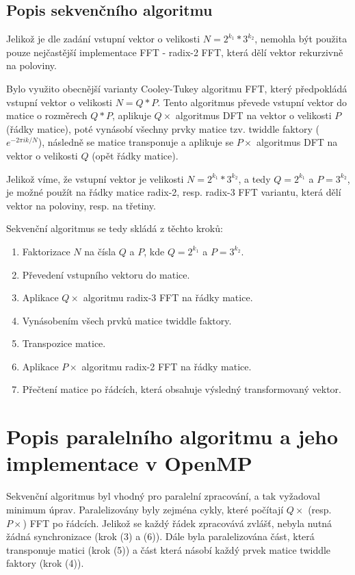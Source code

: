 \documentclass[12pt]{article}
\begin{document}
\subsection{Popis sekvenčního algoritmu}
Jelikož je dle zadání vstupní vektor o velikosti $N=2^{k_{1}}*3^{k_{2}}$, nemohla být použita pouze nejčastější implementace FFT - radix-2 FFT, která dělí vektor rekurzivně na poloviny.\par
Bylo využito obecnější varianty Cooley-Tukey algoritmu FFT, který předpo\-kládá vstupní vektor o velikosti $N=Q*P$. Tento algoritmus převede vstupní vektor do matice o rozměrech $Q*P$, aplikuje $Q\times$ algoritmus DFT na vektor o velikosti $P$ (řádky matice), poté vynásobí všechny prvky matice tzv. twiddle faktory ($e^{-2 \pi i  k / N}$), následně se matice transponuje a aplikuje se $P\times$ algoritmus DFT na vektor o velikosti $Q$ (opět řádky matice).\par
Jelikož víme, že vstupní vektor je velikosti $N=2^{k_{1}}*3^{k_{2}}$, a tedy $Q=2^{k_{1}}$ a $P=3^{k_{2}}$, je možné použít na řádky matice radix-2, resp. radix-3 FFT variantu, která dělí vektor na poloviny, resp. na třetiny.\par
Sekvenční algoritmus se tedy skládá z těchto kroků:
\begin{enumerate}
\item Faktorizace $N$ na čísla $Q$ a $P$, kde $Q=2^{k_{1}}$ a $P=3^{k_{2}}$.
\item Převedení vstupního vektoru do matice.
\item Aplikace $Q\times$ algoritmu radix-3 FFT na řádky matice.
\item Vynásobením všech prvků matice twiddle faktory.
\item Transpozice matice.
\item Aplikace $P\times$ algoritmu radix-2 FFT na řádky matice.
\item Přečtení matice po řádcích, která obsahuje výsledný transformovaný vektor. 
\end{enumerate} 

\section{Popis paralelního algoritmu a jeho implementace v OpenMP}
Sekvenční algoritmus byl vhodný pro paralelní zpracování, a tak vyžadoval minimum úprav. Paralelizovány byly zejména cykly, které počítají $Q\times$ (resp. $P\times$) FFT po řádcích. Jelikož se každý řádek zpracovává zvlášť, nebyla nutná žádná synchronizace (krok (3) a (6)). Dále byla paralelizována část, která transponuje matici (krok (5)) a část která násobí každý prvek matice twiddle faktory (krok (4)).
\end{document}
